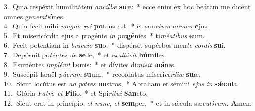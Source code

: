 {3.~}Quia respéxit humilitátem \textit{an}\textit{cíl}\textit{læ} \textbf{su}æ:~* ecce enim ex hoc beátam me dicent omnes ge\textit{ne}\textit{ra}\textit{ti}\textbf{ó}nes.\\
{4.~}Quia fecit mihi \textit{ma}\textit{gna} \textit{qui} \textbf{po}tens est:~* et san\textit{ctum} \textit{no}\textit{men} \textbf{e}jus.\\
{5.~}Et misericórdia ejus a progéni\textit{e} \textit{in} \textit{pro}\textbf{gé}nies~* ti\textit{mén}\textit{ti}\textit{bus} \textbf{e}um.\\
{6.~}Fecit poténtiam in \textit{brá}\textit{chi}\textit{o} \textbf{su}o:~* dispérsit supérbos men\textit{te} \textit{cor}\textit{dis} \textbf{su}i.\\
{7.~}Depósuit po\textit{tén}\textit{tes} \textit{de} \textbf{se}de,~* et e\textit{xal}\textit{tá}\textit{vit} \textbf{hú}\textbf{mi}les.\\
{8.~}Esuriéntes \textit{im}\textit{plé}\textit{vit} \textbf{bo}nis:~* et dívites di\textit{mí}\textit{sit} \textit{i}\textbf{ná}nes.\\
{9.~}Suscépit Israël \textit{pú}\textit{e}\textit{rum} \textbf{su}um,~* recordátus miseri\textit{cór}\textit{di}\textit{æ} \textbf{su}æ.\\
{10.~}Sicut locútus est \textit{ad} \textit{pa}\textit{tres} \textbf{no}stros,~* Abraham et sémini \textit{e}\textit{jus} \textit{in} \textbf{sǽ}\textbf{cu}la.\\
{11.~}Glória \textit{Pa}\textit{tri}, \textit{et} \textbf{Fí}lio,~* et Spi\textit{rí}\textit{tu}\textit{i} \textbf{San}cto.\\
{12.~}Sicut erat in princípio, \textit{et} \textit{nunc}, \textit{et} \textbf{sem}per,~* et in sǽcula sæ\textit{cu}\textit{ló}\textit{rum}. \textbf{A}men.\\
